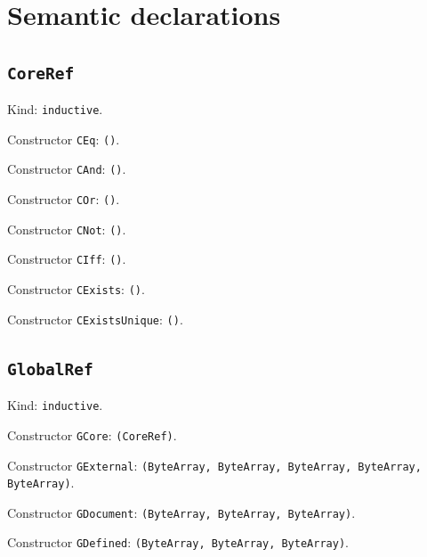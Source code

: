 \documentclass[11pt]{article}
\begin{document}
\section*{Semantic declarations}
\subsection*{\texttt{CoreRef}}
\noindent Kind: \texttt{inductive}.\par
\noindent Constructor \texttt{CEq}: \texttt{()}.\par
\noindent Constructor \texttt{CAnd}: \texttt{()}.\par
\noindent Constructor \texttt{COr}: \texttt{()}.\par
\noindent Constructor \texttt{CNot}: \texttt{()}.\par
\noindent Constructor \texttt{CIff}: \texttt{()}.\par
\noindent Constructor \texttt{CExists}: \texttt{()}.\par
\noindent Constructor \texttt{CExistsUnique}: \texttt{()}.\par
\subsection*{\texttt{GlobalRef}}
\noindent Kind: \texttt{inductive}.\par
\noindent Constructor \texttt{GCore}: \texttt{(CoreRef)}.\par
\noindent Constructor \texttt{GExternal}: \texttt{(ByteArray, ByteArray, ByteArray, ByteArray, ByteArray)}.\par
\noindent Constructor \texttt{GDocument}: \texttt{(ByteArray, ByteArray, ByteArray)}.\par
\noindent Constructor \texttt{GDefined}: \texttt{(ByteArray, ByteArray, ByteArray)}.\par
\end{document}
